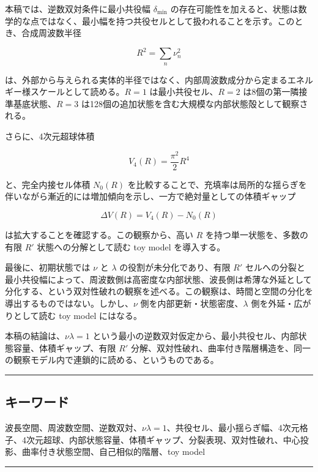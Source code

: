 \documentclass[
]{ltjsarticle}
\begin{document}
本稿では、逆数双対条件に最小共役幅 \(\delta_{\min}\)
の存在可能性を加えると、状態は数学的な点ではなく、最小幅を持つ共役セルとして扱われることを示す。このとき、合成周波数半径

\[
R^2=\sum_n \nu_n^2
\]

は、外部から与えられる実体的半径ではなく、内部周波数成分から定まるエネルギー様スケールとして読める。\(R=1\)
は最小共役セル、\(R=2\) は8個の第一隣接準基底状態、\(R=3\)
は128個の追加状態を含む大規模な内部状態殻として観察される。

さらに、4次元超球体積

\[
V_4(R)=\frac{\pi^2}{2}R^4
\]

と、完全内接セル体積 \(N_0(R)\)
を比較することで、充填率は局所的な揺らぎを伴いながら漸近的には増加傾向を示し、一方で絶対量としての体積ギャップ

\[
\Delta V(R)=V_4(R)-N_0(R)
\]

は拡大することを確認する。この観察から、高い \(R\)
を持つ単一状態を、多数の有限 \(R'\) 状態への分解として読む toy model
を導入する。

最後に、初期状態では \(\nu\) と \(\lambda\) の役割が未分化であり、有限
\(R'\)
セルへの分裂と最小共役幅によって、周波数側は高密度な内部状態、波長側は希薄な外延として分化する、という双対性破れの観察を述べる。この観察は、時間と空間の分化を導出するものではない。しかし、\(\nu\)
側を内部更新・状態密度、\(\lambda\) 側を外延・広がりとして読む toy model
にはなる。

本稿の結論は、\(\nu\lambda=1\)
という最小の逆数双対仮定から、最小共役セル、内部状態容量、体積ギャップ、有限
\(R'\)
分解、双対性破れ、曲率付き階層構造を、同一の観察モデル内で連鎖的に読める、というものである。

\begin{center}\rule{0.5\linewidth}{0.5pt}\end{center}

\subsection{キーワード}\label{ux30adux30fcux30efux30fcux30c9}

波長空間、周波数空間、逆数双対、\(\nu\lambda=1\)、共役セル、最小揺らぎ幅、4次元格子、4次元超球、内部状態容量、体積ギャップ、分裂表現、双対性破れ、中心投影、曲率付き状態空間、自己相似的階層、toy
model

\begin{center}\rule{0.5\linewidth}{0.5pt}\end{center}
\end{document}
